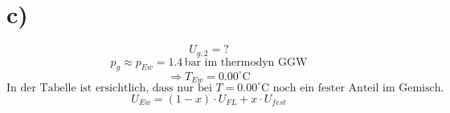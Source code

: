 

\section*{c)}
\[
U_{g,2} = ?
\]
\[
p_g \approx p_{Ew} = 1.4 \, \text{bar} \text{ im thermodyn GGW}
\]
\[
\Rightarrow T_{Ew} = 0.00^\circ \text{C}
\]
\[
\text{In der Tabelle ist ersichtlich, dass nur bei } T = 0.00^\circ \text{C} \text{ noch ein fester Anteil im Gemisch.}
\]
\[
U_{Ew} = (1 - x) \cdot U_{FL} + x \cdot U_{fest}
\]
